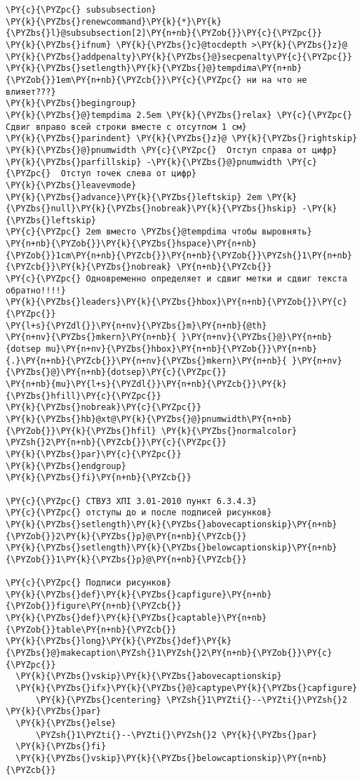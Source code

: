 \begin{Verbatim}[commandchars=\\\{\}]
\PY{c}{\PYZpc{} subsubsection}
\PY{k}{\PYZbs{}renewcommand}\PY{k}{*}\PY{k}{\PYZbs{}l}@subsubsection[2]\PY{n+nb}{\PYZob{}}\PY{c}{\PYZpc{}}
\PY{k}{\PYZbs{}ifnum} \PY{k}{\PYZbs{}c}@tocdepth >\PY{k}{\PYZbs{}z}@
\PY{k}{\PYZbs{}addpenalty}\PY{k}{\PYZbs{}@}secpenalty\PY{c}{\PYZpc{}}
\PY{k}{\PYZbs{}setlength}\PY{k}{\PYZbs{}@}tempdima\PY{n+nb}{\PYZob{}}1em\PY{n+nb}{\PYZcb{}}\PY{c}{\PYZpc{} ни на что не влияет???}
\PY{k}{\PYZbs{}begingroup}
\PY{k}{\PYZbs{}@}tempdima 2.5em \PY{k}{\PYZbs{}relax} \PY{c}{\PYZpc{} Сдвиг вправо всей строки вместе с отсутпом 1 см}
\PY{k}{\PYZbs{}parindent} \PY{k}{\PYZbs{}z}@ \PY{k}{\PYZbs{}rightskip} \PY{k}{\PYZbs{}@}pnumwidth \PY{c}{\PYZpc{}  Отступ справа от цифр}
\PY{k}{\PYZbs{}parfillskip} -\PY{k}{\PYZbs{}@}pnumwidth \PY{c}{\PYZpc{}  Отступ точек слева от цифр}
\PY{k}{\PYZbs{}leavevmode}
\PY{k}{\PYZbs{}advance}\PY{k}{\PYZbs{}leftskip} 2em \PY{k}{\PYZbs{}null}\PY{k}{\PYZbs{}nobreak}\PY{k}{\PYZbs{}hskip} -\PY{k}{\PYZbs{}leftskip} 
\PY{c}{\PYZpc{} 2em вместо \PYZbs{}@tempdima чтобы выровнять}
\PY{n+nb}{\PYZob{}}\PY{k}{\PYZbs{}hspace}\PY{n+nb}{\PYZob{}}1cm\PY{n+nb}{\PYZcb{}}\PY{n+nb}{\PYZob{}}\PYZsh{}1\PY{n+nb}{\PYZcb{}}\PY{k}{\PYZbs{}nobreak} \PY{n+nb}{\PYZcb{}}
\PY{c}{\PYZpc{} Одновременно определяет и сдвиг метки и сдвиг текста обратно!!!!}
\PY{k}{\PYZbs{}leaders}\PY{k}{\PYZbs{}hbox}\PY{n+nb}{\PYZob{}}\PY{c}{\PYZpc{}}
\PY{l+s}{\PYZdl{}}\PY{n+nv}{\PYZbs{}m}\PY{n+nb}{@th}
\PY{n+nv}{\PYZbs{}mkern}\PY{n+nb}{ }\PY{n+nv}{\PYZbs{}@}\PY{n+nb}{dotsep mu}\PY{n+nv}{\PYZbs{}hbox}\PY{n+nb}{\PYZob{}}\PY{n+nb}{.}\PY{n+nb}{\PYZcb{}}\PY{n+nv}{\PYZbs{}mkern}\PY{n+nb}{ }\PY{n+nv}{\PYZbs{}@}\PY{n+nb}{dotsep}\PY{c}{\PYZpc{}}
\PY{n+nb}{mu}\PY{l+s}{\PYZdl{}}\PY{n+nb}{\PYZcb{}}\PY{k}{\PYZbs{}hfill}\PY{c}{\PYZpc{}}
\PY{k}{\PYZbs{}nobreak}\PY{c}{\PYZpc{}}
\PY{k}{\PYZbs{}hb}@xt@\PY{k}{\PYZbs{}@}pnumwidth\PY{n+nb}{\PYZob{}}\PY{k}{\PYZbs{}hfil} \PY{k}{\PYZbs{}normalcolor} \PYZsh{}2\PY{n+nb}{\PYZcb{}}\PY{c}{\PYZpc{}}
\PY{k}{\PYZbs{}par}\PY{c}{\PYZpc{}}
\PY{k}{\PYZbs{}endgroup}
\PY{k}{\PYZbs{}fi}\PY{n+nb}{\PYZcb{}}

\PY{c}{\PYZpc{} СТВУЗ ХПІ 3.01-2010 пункт 6.3.4.3}
\PY{c}{\PYZpc{} отступы до и после подписей рисунков}
\PY{k}{\PYZbs{}setlength}\PY{k}{\PYZbs{}abovecaptionskip}\PY{n+nb}{\PYZob{}}2\PY{k}{\PYZbs{}p}@\PY{n+nb}{\PYZcb{}}
\PY{k}{\PYZbs{}setlength}\PY{k}{\PYZbs{}belowcaptionskip}\PY{n+nb}{\PYZob{}}1\PY{k}{\PYZbs{}p}@\PY{n+nb}{\PYZcb{}}

\PY{c}{\PYZpc{} Подписи рисунков}
\PY{k}{\PYZbs{}def}\PY{k}{\PYZbs{}capfigure}\PY{n+nb}{\PYZob{}}figure\PY{n+nb}{\PYZcb{}}
\PY{k}{\PYZbs{}def}\PY{k}{\PYZbs{}captable}\PY{n+nb}{\PYZob{}}table\PY{n+nb}{\PYZcb{}}
\PY{k}{\PYZbs{}long}\PY{k}{\PYZbs{}def}\PY{k}{\PYZbs{}@}makecaption\PYZsh{}1\PYZsh{}2\PY{n+nb}{\PYZob{}}\PY{c}{\PYZpc{}}
  \PY{k}{\PYZbs{}vskip}\PY{k}{\PYZbs{}abovecaptionskip}
  \PY{k}{\PYZbs{}ifx}\PY{k}{\PYZbs{}@}captype\PY{k}{\PYZbs{}capfigure}
      \PY{k}{\PYZbs{}centering} \PYZsh{}1\PYZti{}--\PYZti{}\PYZsh{}2 \PY{k}{\PYZbs{}par}
  \PY{k}{\PYZbs{}else}
      \PYZsh{}1\PYZti{}--\PYZti{}\PYZsh{}2 \PY{k}{\PYZbs{}par}
  \PY{k}{\PYZbs{}fi}
  \PY{k}{\PYZbs{}vskip}\PY{k}{\PYZbs{}belowcaptionskip}\PY{n+nb}{\PYZcb{}}
  

\end{Verbatim}
